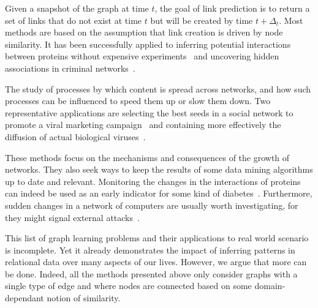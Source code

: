 \begin{description}[leftmargin=*]
  \item[link prediction~\autocite{linkPredSurvey16}] Given a snapshot of the graph at time $t$, the
    goal of link prediction is to return a set of links that do not exist at time $t$ but will be
    created by time $t+\Delta_t$. Most methods are based on the assumption that link creation is
    driven by node similarity. It has been successfully applied to inferring potential interactions
    between proteins without expensive experiments~\autocite{linkPredBio06} and uncovering hidden
    associations in criminal networks~\autocite{linkPredCrime08}.

  \item[information and influence propagation~\autocite{infmax13}] The study of processes by which
    content is spread across networks, and how such processes can be influenced to speed them up or
    slow them down. Two representative applications are selecting the best seeds in a social network
    to promote a viral marketing campaign~\autocite{infmaxKempe15} and containing more effectively
    the diffusion of actual biological viruses~\autocite{influenceBio13}.

  \item[network evolution~\autocite{networkEvolution14}] These methods focus on the mechanisms and
    consequences of the growth of networks. They also seek ways to keep the results of some data mining
    algorithms up to date and relevant. Monitoring the changes in the interactions of proteins
    can indeed be used as an early indicator for some kind of diabetes~\autocite{evolBio10}.
    Furthermore, sudden changes in a network of computers are usually worth investigating, for they
    might signal external attacks~\autocite{evolSecurity04}.

\end{description}

This list of graph learning problems and their applications to real world scenario is incomplete.
Yet it already demonstrates the impact of inferring patterns in relational data over many aspects of
our lives. However, we argue that more can be done. Indeed, all the methods presented above only
consider graphs with a single type of edge and where nodes are connected based on some
domain-dependant notion of similarity.
